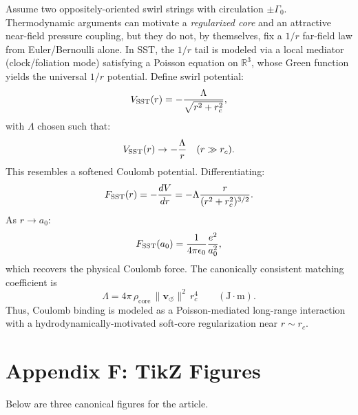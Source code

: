 \documentclass[11pt]{article}
\newcommand{\rc}{r_c}                                    %
\newcommand{\Lam}{\Lambda}                               %
\begin{document}
        Assume two oppositely-oriented swirl strings with circulation $\pm\Gamma_0$.
        Thermodynamic arguments can motivate a \emph{regularized core} and an attractive near-field pressure coupling,
        but they do not, by themselves, fix a $1/r$ far-field law from Euler/Bernoulli alone.
        In SST, the $1/r$ tail is modeled via a local mediator (clock/foliation mode) satisfying a Poisson equation on $\mathbb{R}^3$,
        whose Green function yields the universal $1/r$ potential.
        Define swirl potential:
        \begin{equation}
            V_{\rm SST}(r)
            = - \frac{\Lam}{\sqrt{r^2 + \rc^2}},
        \end{equation}
        with $\Lam$ chosen such that:
        \begin{equation}
            V_{\rm SST}(r) \rightarrow - \frac{\Lam}{r}
            \quad (r \gg \rc).
        \end{equation}
        This resembles a softened Coulomb potential.
        Differentiating:
        \begin{equation}
            F_{\rm SST}(r)
            = - \frac{dV}{dr}
            = - \Lam \frac{r}{(r^2 + \rc^2)^{3/2}}.
        \end{equation}
        As $r \rightarrow a_0$:
        \begin{equation}
            F_{\rm SST}(a_0)
            = \frac{1}{4\pi\epsilon_0} \frac{e^2}{a_0^2},
        \end{equation}
        which recovers the physical Coulomb force.
        The canonically consistent matching coefficient is
        \begin{equation}
        \Lambda = 4\pi\,\rho_{\text{core}}\,\lVert \mathbf{v}_{\!\boldsymbol{\circlearrowleft}}\rVert^{2}\,r_c^{4}
        \qquad (\mathrm{J\cdot m}).
        \end{equation}
        Thus, Coulomb binding is modeled as a Poisson-mediated long-range interaction with a hydrodynamically-motivated
        soft-core regularization near $r\sim r_c$.

    \section*{Appendix F: TikZ Figures}

        Below are three canonical figures for the article.
\end{document}
